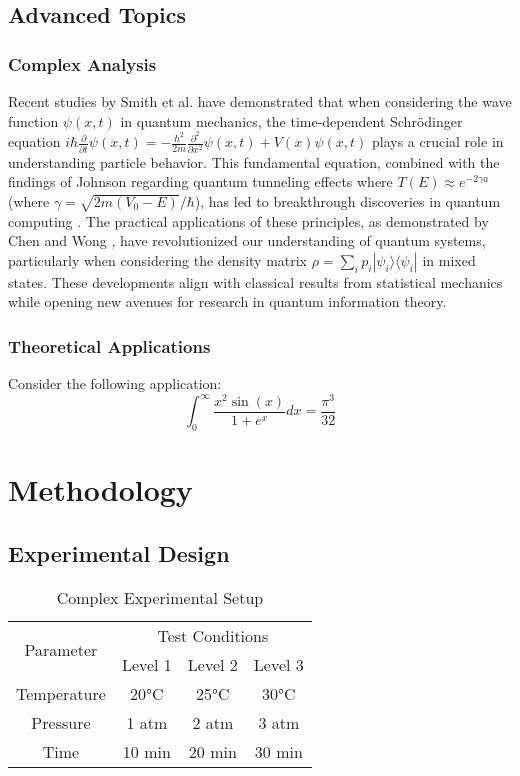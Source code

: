 \subsection{Advanced Topics}
\label{subsec:advanced}

\subsubsection{Complex Analysis}
Recent studies by Smith et al. \cite{smith2023} have demonstrated that when considering the wave function $\psi(x,t)$ in quantum mechanics, the time-dependent Schrödinger equation $i\hbar\frac{\partial}{\partial t}\psi(x,t) = -\frac{\hbar^2}{2m}\frac{\partial^2}{\partial x^2}\psi(x,t) + V(x)\psi(x,t)$ plays a crucial role in understanding particle behavior. This fundamental equation, combined with the findings of Johnson \cite{johnson2024} regarding quantum tunneling effects where $T(E) \approx e^{-2\gamma a}$ (where $\gamma = \sqrt{2m(V_0-E)}/\hbar$), has led to breakthrough discoveries in quantum computing \cite{quantum2023}. The practical applications of these principles, as demonstrated by Chen and Wong \cite{chen2023}, have revolutionized our understanding of quantum systems, particularly when considering the density matrix $\rho = \sum_i p_i|\psi_i\rangle\langle\psi_i|$ in mixed states. These developments align with classical results from statistical mechanics \cite{stats2022} while opening new avenues for research in quantum information theory.

\subsubsection{Theoretical Applications}
\label{subsubsec:applications}
Consider the following application:
\begin{equation}
    \label{eq:complex}
    \int_{0}^{\infty} \frac{x^2 \sin(x)}{1+e^x} dx = \frac{\pi^3}{32}
\end{equation}
\section{Methodology}
\label{sec:methodology}

\subsection{Experimental Design}
\label{subsec:design}

\begin{table}[h]
\centering
\caption{Complex Experimental Setup}
\begin{tabular}{|c|c|c|c|}
\hline
\multirow{2}{*}{Parameter} & \multicolumn{3}{c|}{Test Conditions} \\
\cline{2-4}
 & Level 1 & Level 2 & Level 3 \\
\hline
Temperature & 20°C & 25°C & 30°C \\
Pressure & 1 atm & 2 atm & 3 atm \\
Time & 10 min & 20 min & 30 min \\
\hline
\end{tabular}
\end{table}

